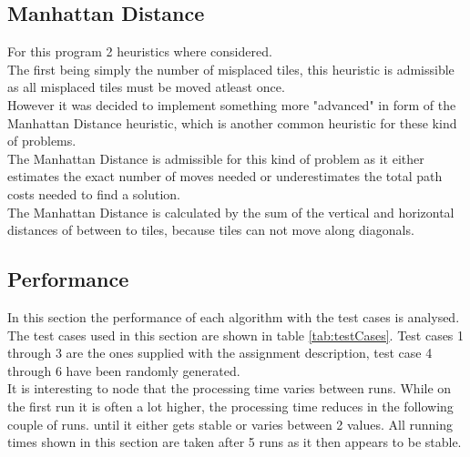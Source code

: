 \documentclass[journal]{IEEEtran}
\begin{document}
\subsection{Manhattan Distance}
For this program 2 heuristics where considered.\\
The first being simply the number of misplaced tiles, this heuristic is admissible as all misplaced tiles must be moved atleast once. \\
However it was decided to implement something more "advanced" in form of the Manhattan Distance heuristic, which is another common heuristic for these kind of problems\cite{russell2009artificial}. \\
The Manhattan Distance is admissible for this kind of problem as it either estimates the exact number of moves needed or underestimates the total path costs needed to find a solution. \\
The Manhattan Distance is calculated by the sum of the vertical and horizontal distances of between to tiles, because tiles can not move along diagonals. \\

\subsection{Performance}
In this section the performance of each algorithm with the test cases is analysed. \\
The test cases used in this section are shown in table \ref{tab:testCases}. 
Test cases 1 through 3 are the ones supplied with the assignment description, test case 4 through 6 have been randomly generated.\\

It is interesting to node that the processing time varies between runs. While on the first run it is often a lot higher, the processing time reduces in the following couple of runs. until it either gets stable or varies between 2 values. All running times shown in this section are taken after 5 runs as it then appears to be stable. \\
\end{document}
